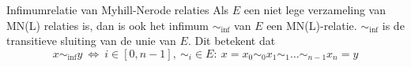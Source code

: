 
\begin{lem}{Infimumrelatie van Myhill-Nerode relaties}
    Als $E$ een niet lege verzameling van MN(L) relaties is, dan is ook het infimum $\sim_{\text{inf}}$ van $E$ een MN(L)-relatie.
    $\sim_{\text{inf}}$ is de transitieve sluiting van de unie van $E$. Dit betekent dat
    \begin{equation*}
        x \sim_{\text{inf}} y \ \Leftrightarrow \ i \in [0, n-1], \ \sim_i \in E: \ x = x_0 \sim_0 x_1 \sim_1 \ldots \sim_{n-1} x_n = y
    \end{equation*}
    \vspace{-0.5cm}
\end{lem}

\newpage

